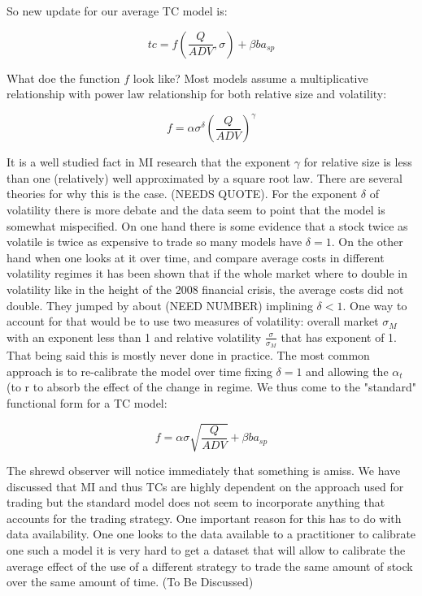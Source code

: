 So new update for our average TC model is:

\begin{equation}\label{eq:tc_3}
		tc = f(\frac{Q}{ADV}, \sigma) + \beta ba_{sp}
\end{equation}

What doe the function $f$ look like? Most models assume a multiplicative relationship with power law relationship for both relative size and volatility:

\begin{equation}\label{eq:tc_3}
		f =\alpha  \sigma^{\delta} (\frac{Q}{ADV})^{\gamma}
\end{equation}

It is a well studied fact in MI research that the exponent $\gamma$ for relative size is less than one (relatively) well approximated by a square root law. There are several theories for why this is the case. (NEEDS QUOTE). For the exponent $\delta$ of volatility there is more debate and the data seem to point that the model is somewhat mispecified. On one hand there is some evidence that a stock twice as volatile is twice as expensive to trade so many models have $\delta = 1$. On the other hand when one looks at it over time, and compare average costs in different volatility regimes it has been shown that if the whole market where to double in volatility like in the height of the 2008 financial crisis, the average costs did not double. They jumped by about (NEED NUMBER) implining $\delta <1$. One way to account for that would be to use two measures of volatility: overall market  $\sigma_M$ with an exponent less than 1 and relative volatility $\frac{\sigma}{\sigma_M}$ that has exponent of 1. That being said this is mostly never done in practice. The most common approach is to re-calibrate the model over time fixing $\delta=1$ and allowing the $\alpha_t$ (to r to absorb the effect of the change in regime. We thus come to the "standard" functional form for a TC model:

\begin{equation}\label{eq:tc_3}
		f =\alpha  \sigma \sqrt{\frac{Q}{ADV}} +  \beta ba_{sp}
\end{equation}

The shrewd observer will notice immediately that something is amiss. We have discussed that MI and thus TCs are highly dependent on the approach used for trading but the standard model does not seem to incorporate anything that accounts for the trading strategy. One important reason for this has to do with data availability. One one looks to the data available to a practitioner to calibrate one such a model it is very hard to get a dataset that will allow to calibrate the average effect of the use of a different strategy to trade the same amount of stock over the same amount of time. (To Be Discussed)

